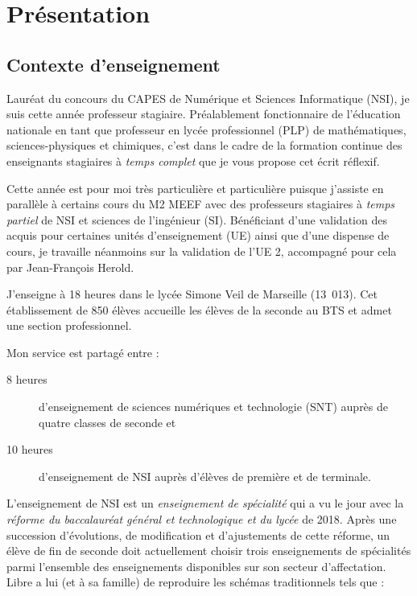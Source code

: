 \section{Présentation}


\subsection{Contexte d'enseignement}

Lauréat du concours du CAPES de Numérique et Sciences Informatique (NSI), je suis  cette année professeur stagiaire. Préalablement fonctionnaire de l'éducation nationale en tant que professeur en lycée professionnel (PLP) de mathématiques, sciences-physiques et chimiques, c'est dans le cadre de la formation continue des enseignants stagiaires à \emph{temps complet} que je vous propose cet écrit réflexif.

Cette année est pour moi très particulière et particulière puisque j'assiste en parallèle à certains cours du M2 MEEF avec des professeurs stagiaires à \emph{temps partiel} de NSI et sciences de l'ingénieur (SI). Bénéficiant d'une validation des acquis pour certaines unités d'enseignement (UE) ainsi que d'une dispense de cours, je travaille néanmoins sur la validation de l'UE 2, accompagné pour cela par Jean-François Herold.

J'enseigne à 18 heures dans le lycée Simone Veil de Marseille (13~013). Cet établissement de 850 élèves accueille les élèves de la seconde au BTS et admet une section professionnel.

Mon service est partagé entre :

\begin{description}
    \item[8 heures] d'enseignement de sciences numériques et technologie (SNT) auprès de quatre classes de seconde et
    \item[10 heures] d'enseignement de NSI auprès d'élèves de première et de terminale.
\end{description}

L'enseignement de NSI est un \emph{enseignement de spécialité} qui a vu le jour avec la \emph{réforme du baccalauréat général et technologique et du lycée} de 2018. Après une succession d'évolutions, de modification et d'ajustements de cette réforme, un élève de fin de seconde doit actuellement choisir trois enseignements de spécialités parmi l'ensemble des enseignements disponibles sur son secteur d'affectation. Libre a lui (et à sa famille) de reproduire les schémas traditionnels tels que :

